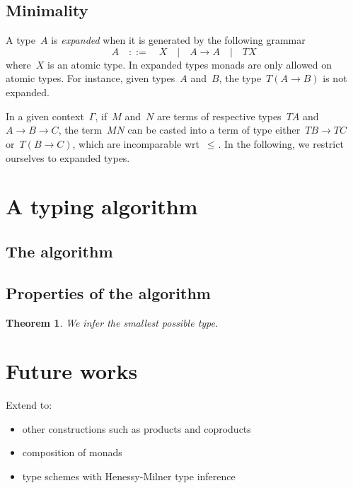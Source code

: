 \documentclass{article}
\newtheorem{theorem}{Theorem}
\renewcommand{\leq}{\leqslant}
\newcommand{\cast}[1]{\leq_{#1}}
\newcommand{\gramdef}{\quad::=\quad}
\newcommand{\gramor}{\quad|\quad}
\begin{document}
\subsection{Minimality}
A type~$A$ is \emph{expanded} when it is generated by the following grammar
\[
A\gramdef X\gramor A\to A\gramor TX
\]
where~$X$ is an atomic type. In expanded types monads are only allowed on atomic
types. For instance, given types~$A$ and~$B$, the type~$T(A\to B)$ is not
expanded.

In a given context~$\Gamma$, if~$M$ and~$N$ are terms of respective types~$TA$
and \hbox{$A\to B\to C$}, the term~$MN$ can be casted into a term of type
either~$TB\to TC$ or~$T(B\to C)$, which are incomparable wrt~$\cast{}$. In the
following, we restrict ourselves to expanded types.

\section{A typing algorithm}
\subsection{The algorithm}

\subsection{Properties of the algorithm}
\begin{theorem}
  We infer the smallest possible type.
\end{theorem}

\section{Future works}
Extend to:
\begin{itemize}
\item other constructions such as products and coproducts
\item composition of monads
\item type schemes with Henessy-Milner type inference
\end{itemize}



\end{document}

